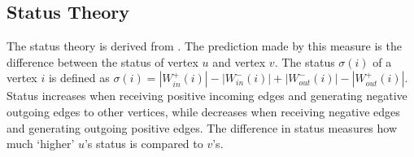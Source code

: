 
\subsection{Status Theory}

The status theory is derived from \cite{Status}. The prediction made by this measure
is the difference between the status of vertex $u$ and vertex $v$. The status
$\sigma (i)$ of a vertex $i$ is defined as $\sigma (i) = |W^+_{in}(i)| - |W^-_{in}(i)| + |W^-_{out}(i)| - |W^+_{out}(i)|$.
Status increases when receiving positive incoming edges and generating negative 
outgoing edges to other vertices, while decreases when receiving negative edges 
and generating outgoing positive edges. The difference in status measures how much ‘higher’ $u’$s 
status is compared to $v’$s.
